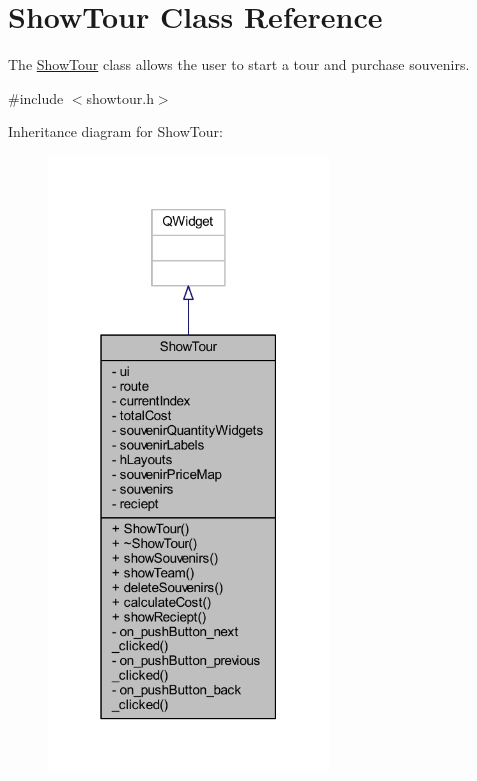 \hypertarget{class_show_tour}{}\section{Show\+Tour Class Reference}
\label{class_show_tour}


The \hyperlink{class_show_tour}{Show\+Tour} class allows the user to start a tour and purchase souvenirs.  




{\ttfamily \#include $<$showtour.\+h$>$}



Inheritance diagram for Show\+Tour\+:
\nopagebreak
\begin{figure}[H]
\begin{center}
\leavevmode
\includegraphics[width=211pt]{class_show_tour__inherit__graph}
\end{center}
\end{figure}


